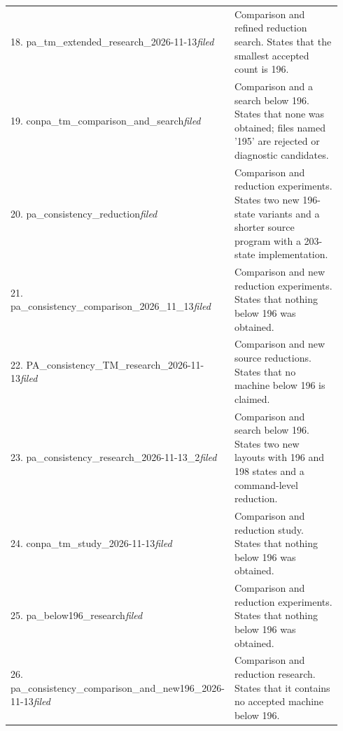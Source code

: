 \begin{longtable}{@{}p{0.43\linewidth}p{0.51\linewidth}@{}}
18. pa\_\allowbreak{}tm\_\allowbreak{}extended\_\allowbreak{}research\_\allowbreak{}2026-11-13\newline\emph{filed} & Comparison and refined reduction search. States that the smallest accepted count is 196.\\[5pt]
19. conpa\_\allowbreak{}tm\_\allowbreak{}comparison\_\allowbreak{}and\_\allowbreak{}search\newline\emph{filed} & Comparison and a search below 196. States that none was obtained; files named '195' are rejected or diagnostic candidates.\\[5pt]
20. pa\_\allowbreak{}consistency\_\allowbreak{}reduction\newline\emph{filed} & Comparison and reduction experiments. States two new 196-state variants and a shorter source program with a 203-state implementation.\\[5pt]
21. pa\_\allowbreak{}consistency\_\allowbreak{}comparison\_\allowbreak{}2026\_\allowbreak{}11\_\allowbreak{}13\newline\emph{filed} & Comparison and new reduction experiments. States that nothing below 196 was obtained.\\[5pt]
22. PA\_\allowbreak{}consistency\_\allowbreak{}TM\_\allowbreak{}research\_\allowbreak{}2026-11-13\newline\emph{filed} & Comparison and new source reductions. States that no machine below 196 is claimed.\\[5pt]
23. pa\_\allowbreak{}consistency\_\allowbreak{}research\_\allowbreak{}2026-11-13\_\allowbreak{}2\newline\emph{filed} & Comparison and search below 196. States two new layouts with 196 and 198 states and a command-level reduction.\\[5pt]
24. conpa\_\allowbreak{}tm\_\allowbreak{}study\_\allowbreak{}2026-11-13\newline\emph{filed} & Comparison and reduction study. States that nothing below 196 was obtained.\\[5pt]
25. pa\_\allowbreak{}below196\_\allowbreak{}research\newline\emph{filed} & Comparison and reduction experiments. States that nothing below 196 was obtained.\\[5pt]
26. pa\_\allowbreak{}consistency\_\allowbreak{}comparison\_\allowbreak{}and\_\allowbreak{}new196\_\allowbreak{}2026-11-13\newline\emph{filed} & Comparison and reduction research. States that it contains no accepted machine below 196.\\[5pt]

\end{longtable}
